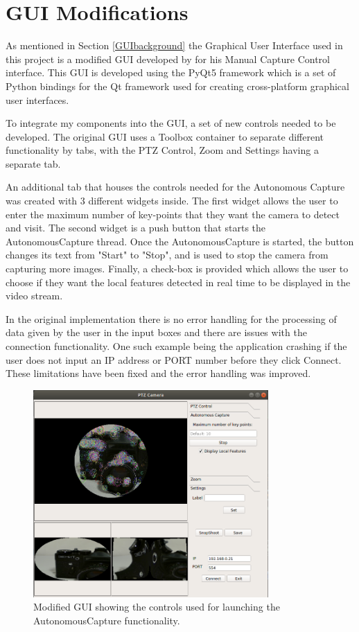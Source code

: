 \documentclass{l4proj}
\begin{document}
\section{GUI Modifications}

As mentioned in Section \ref{GUIbackground} the Graphical User Interface used in this project is a modified GUI developed by \citet{JianwenZhou} for his Manual Capture Control interface. This GUI is developed using the PyQt5 framework which is a set of Python bindings for the Qt framework used for creating cross-platform graphical user interfaces. 

To integrate my components into the GUI, a set of new controls needed to be developed. The original GUI uses a Toolbox container to separate different functionality by tabs, with the PTZ Control, Zoom and Settings having a separate tab. 

An additional tab that houses the controls needed for the Autonomous Capture was created with 3 different widgets inside. The first widget allows the user to enter the maximum number of key-points that they want the camera to detect and visit. The second widget is a push button that starts the AutonomousCapture thread. Once the AutonomousCapture is started, the button changes its text from "Start" to "Stop", and is used to stop the camera from capturing more images.   Finally, a check-box is provided which allows the user to choose if they want the local features detected in real time to be displayed in the video stream. 

In the original implementation there is no error handling for the processing of data given by the user in the input boxes and there are issues with the connection functionality. One such example being the application crashing if the user does not input an IP address or PORT number before they click Connect. 
These limitations have been fixed and the error handling was improved.  



\begin{figure}[H]
    \centering
    \includegraphics[width=0.8\textwidth]{l4template-master/images/guimodified.png}
    \caption{Modified GUI showing the controls used for launching the AutonomousCapture functionality.}
    \label{modifiedgui}
\end{figure}
\end{document}
